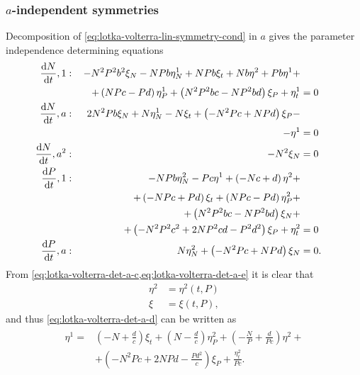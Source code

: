 \subsubsection{\texorpdfstring{\(a\)-independent symmetries}{a-independent symmetries}}

Decomposition of \cref{eq:lotka-volterra-lin-symmetry-cond} in \(a\) gives the parameter independence determining equations
\begin{subequations}\label{eq:lotka-volterra-det-a}
  \begin{flalign}
    \diff{N}{t}, 1 & : & - N^{2} P^{2} b^{2} \xi_{N} - N P b \eta^1_{N} + N P b \xi_{t} + N b \eta^{2} + P b \eta^{1} +&&&\\
    &&\quad+ \left(N P c - P d\right) \eta^1_{P} + \left(N^{2} P^{2} b c - N P^{2} b d\right) \xi_{P} + \eta^1_{t} &= 0 && \FlLabel{eq:lotka-volterra-det-a-a}\\
    \diff{N}{t}, a & : & 2 N^{2} P b \xi_{N} + N \eta^1_{N} - N \xi_{t} + \left(- N^{2} P c + N P d\right) \xi_{P} -&&&\\
    &&\quad- \eta^{1} &= 0 && \FlLabel{eq:lotka-volterra-det-a-b}\\
    \diff{N}{t}, a^2 & : & - N^{2} \xi_{N} &= 0 && \FlLabel{eq:lotka-volterra-det-a-c}\\
    \diff{P}{t}, 1 & : & - N P b \eta^2_{N} - P c \eta^{1} + \left(- N c + d\right) \eta^{2} +&&&\\
    &&\quad+  \left(- N P c + P d\right) \xi_{t} + \left(N P c - P d\right) \eta^2_{P} +&&&\\
    &&\quad+ \left(N^{2} P^{2} b c - N P^{2} b d\right) \xi_{N} +&&&\\
    &&\quad+ \left(- N^{2} P^{2} c^{2} + 2 N P^{2} c d - P^{2} d^{2}\right) \xi_{P} + \eta^2_{t} &= 0 && \FlLabel{eq:lotka-volterra-det-a-d}\\
    \diff{P}{t}, a & : & N \eta^2_{N} + \left(- N^{2} P c + N P d\right) \xi_{N} &= 0. && \FlLabel{eq:lotka-volterra-det-a-e}
  \end{flalign}
\end{subequations}
From \cref{eq:lotka-volterra-det-a-c,eq:lotka-volterra-det-a-e} it is clear that
\begin{align}
  \eta^2 &= \eta^2(t, P)\\
  \xi &= \xi(t, P),
\end{align}
and thus \cref{eq:lotka-volterra-det-a-d} can be written as
\begin{align}
  \begin{split}
    \eta^{1} =& \left(- N + \frac{d}{c}\right) \xi_{t} + \left(N - \frac{d}{c}\right) \eta^2_{P} + \left(- \frac{N}{P} + \frac{d}{P c}\right) \eta^{2} +\\
    &+ \left(- N^{2} P c + 2 N P d - \frac{P d^{2}}{c}\right) \xi_{P} + \frac{\eta^2_{t}}{P c}.
  \end{split}
\end{align}
